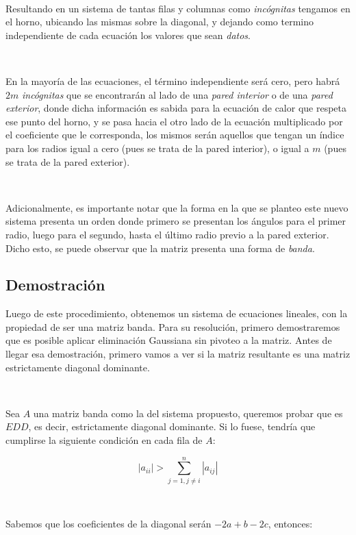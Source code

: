 \

Resultando en un sistema de tantas filas y columnas como \emph{incógnitas} tengamos en el horno, ubicando las mismas sobre la diagonal, y dejando como termino independiente de cada ecuación los valores que sean \emph{datos}. 

\

En la mayoría de las ecuaciones, el término independiente será cero, pero habrá $2m$ \emph{incógnitas} que se encontrarán al lado de una \emph{pared interior} o de una \emph{pared exterior}, donde dicha información es sabida para la ecuación de calor que respeta ese punto del horno, y se pasa hacia el otro lado de la ecuación multiplicado por el coeficiente que le corresponda, los mismos serán aquellos que tengan un índice para los radios igual a cero (pues se trata de la pared interior), o igual a $m$ (pues se trata de la pared exterior).

\

Adicionalmente, es importante notar que la forma en la que se planteo este nuevo sistema presenta un orden donde primero se presentan los ángulos para el primer radio, luego para el segundo, hasta el último radio previo a la pared exterior. Dicho esto, se puede observar que la matriz presenta una forma de \emph{banda}.


\newpage

\subsection{Demostración}
Luego de este procedimiento, obtenemos un sistema de ecuaciones lineales, con la propiedad de ser una matriz banda. Para su resolución, primero demostraremos que es posible aplicar eliminación Gaussiana sin pivoteo a la matriz.  Antes de llegar esa demostración, primero vamos a ver si la matriz resultante es una matriz estrictamente diagonal dominante. 

\

Sea $A$ una matriz banda como la del sistema propuesto, queremos probar que es $EDD$, es decir, estrictamente diagonal dominante. Si lo fuese, tendría que cumplirse la siguiente condición en cada fila de $A$:

\begin{equation}\label{ecuacion_edd}
     | a_{ii} | > 
\sum_{j=1, j \neq i}^{n} |a_{ij}| 
\end{equation}

\

Sabemos que los coeficientes de la diagonal serán $-2a +b - 2c$, entonces:  

